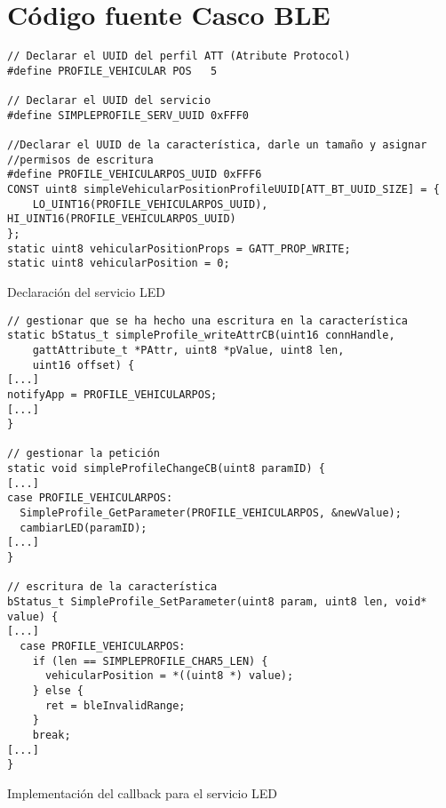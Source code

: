 \section{Código fuente Casco BLE}
\begin{listing}
\begin{minipage}{.4\textwidth}
\begin{verbatim}
// Declarar el UUID del perfil ATT (Atribute Protocol)
#define PROFILE_VEHICULAR POS   5

// Declarar el UUID del servicio
#define SIMPLEPROFILE_SERV_UUID 0xFFF0

//Declarar el UUID de la característica, darle un tamaño y asignar
//permisos de escritura
#define PROFILE_VEHICULARPOS_UUID 0xFFF6
CONST uint8 simpleVehicularPositionProfileUUID[ATT_BT_UUID_SIZE] = {
	LO_UINT16(PROFILE_VEHICULARPOS_UUID), HI_UINT16(PROFILE_VEHICULARPOS_UUID)
};
static uint8 vehicularPositionProps = GATT_PROP_WRITE;
static uint8 vehicularPosition = 0;

\end{verbatim}
\end{minipage}
\caption{Declaración del servicio LED}\label{alg:mota1}
\end{listing}

\begin{listing}
\begin{minipage}{.4\textwidth}
\begin{verbatim}
// gestionar que se ha hecho una escritura en la característica
static bStatus_t simpleProfile_writeAttrCB(uint16 connHandle,
    gattAttribute_t *PAttr, uint8 *pValue, uint8 len,
    uint16 offset) {
[...]
notifyApp = PROFILE_VEHICULARPOS;
[...]
}

// gestionar la petición
static void simpleProfileChangeCB(uint8 paramID) {
[...]
case PROFILE_VEHICULARPOS:
  SimpleProfile_GetParameter(PROFILE_VEHICULARPOS, &newValue);
  cambiarLED(paramID);
[...]
}

// escritura de la característica
bStatus_t SimpleProfile_SetParameter(uint8 param, uint8 len, void* value) {
[...]
  case PROFILE_VEHICULARPOS:
    if (len == SIMPLEPROFILE_CHAR5_LEN) {
      vehicularPosition = *((uint8 *) value);
    } else {
      ret = bleInvalidRange;
    }
    break;
[...]
}
\end{verbatim}
\end{minipage}
\caption{Implementación del callback para el servicio LED}\label{alg:mota2}
\end{listing}
